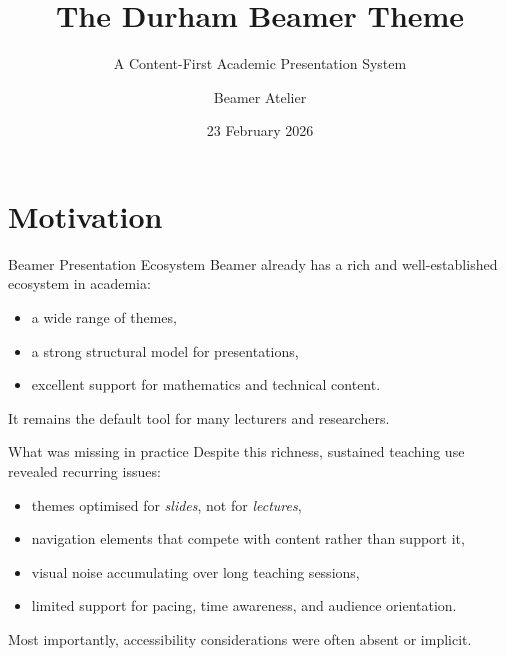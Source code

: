 \documentclass[aspectratio=169]{beamer}
\title{The Durham Beamer Theme}
\subtitle{A Content-First Academic Presentation System}
\author{Beamer Atelier}
\institute{Design Studio Executive}
\date{23 February 2026}
\begin{document}
\maketitle
\DurhamOutline

\section{Motivation}
\begin{frame}{Beamer Presentation Ecosystem}
Beamer already has a rich and well-established ecosystem in academia:
\begin{itemize}
  \item a wide range of themes,
  \item a strong structural model for presentations,
  \item excellent support for mathematics and technical content.
\end{itemize}

\vspace{0.8em}
It remains the default tool for many lecturers and researchers.
\end{frame}

\begin{frame}{What was missing in practice}
Despite this richness, sustained teaching use revealed recurring issues:
\begin{itemize}
  \item themes optimised for \emph{slides}, not for \emph{lectures},
  \item navigation elements that compete with content rather than support it,
  \item visual noise accumulating over long teaching sessions,
  \item limited support for pacing, time awareness, and audience orientation.
\end{itemize}

\vspace{0.6em}
Most importantly, accessibility considerations were often absent or implicit.
\end{frame}
\end{document}

